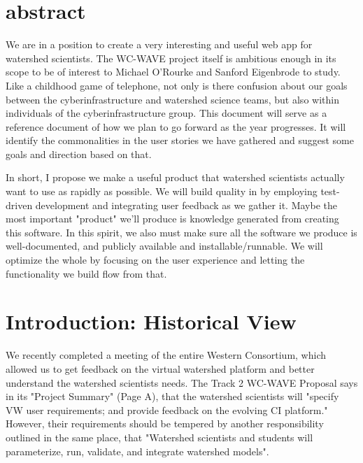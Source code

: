 \documentclass[
11pt, %
a4paper, %
oneside, %
twoside, %
headinclude,footinclude, %
BCOR5mm, %
]{scrartcl}
\title{\normalfont\spacedallcaps{Virtual Watershed Platform}} %
\subtitle{\normalfont\spacedallcaps{Plan for 2015: Optimize the Whole}} %
\author{\spacedlowsmallcaps{Matthew A. Turner*}} %
\begin{document}
\maketitle %

\setcounter{tocdepth}{2} %

\tableofcontents %
\section*{abstract}

We are in a position to create a very interesting and useful web app for watershed scientists.
The WC-WAVE project itself is ambitious enough in its scope to be of interest to 
Michael O'Rourke and Sanford Eigenbrode to study. Like a childhood game of telephone, not 
only is there confusion about our goals 
between the cyberinfrastructure and watershed science teams, but also
within individuals of the cyberinfrastructure group. This document will serve as a reference
document of how we plan to go forward as the year progresses. 
It will identify the commonalities
in the user stories we have gathered and suggest some goals and direction based on that.

In short, I propose we make a useful product that watershed scientists actually want to use
as rapidly as possible. We will build quality in by employing test-driven development and 
integrating user feedback as we gather it. Maybe the most important "product" we'll produce
is knowledge generated from creating this software. In
this spirit, we also must make sure all the software we produce is well-documented, and publicly 
available and installable/runnable. We will optimize the whole by focusing on 
the user experience and letting the functionality we build flow from that.

{\let\thefootnote\relax{}}



\newpage
     

\section{Introduction: Historical View} %
\label{sec:intro}

We recently completed a meeting of the entire Western Consortium, which allowed us to get
feedback on the virtual watershed platform and better understand the watershed scientists needs.
The Track 2 WC-WAVE Proposal says in its "Project Summary" (Page A), that the watershed scientists
will "specify VW user requirements; and provide feedback on the evolving CI platform." However, 
their requirements should be tempered by another responsibility outlined in the same place, that
"Watershed scientists and students will parameterize, run, validate, and integrate watershed models".
\end{document}
